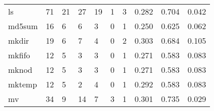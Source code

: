 \begin{longtable}{lp{1.3cm}p{1.3cm}p{1.3cm}p{1.3cm}p{1.3cm}p{1.3cm}p{1.3cm}p{1.3cm}p{1.3cm}}
ls        &                     71 &                                            21 &                                           27 &                                          19 &                                            1 &                                          3 &                                0.282 &                                  0.704 &                                0.042 \\
md5sum    &                     16 &                                             6 &                                            6 &                                           3 &                                            0 &                                          1 &                                0.250 &                                  0.625 &                                0.062 \\
mkdir     &                     19 &                                             6 &                                            7 &                                           4 &                                            0 &                                          2 &                                0.303 &                                  0.684 &                                0.105 \\
mkfifo    &                     12 &                                             5 &                                            3 &                                           3 &                                            0 &                                          1 &                                0.271 &                                  0.583 &                                0.083 \\
mknod     &                     12 &                                             5 &                                            3 &                                           3 &                                            0 &                                          1 &                                0.271 &                                  0.583 &                                0.083 \\
mktemp    &                     12 &                                             5 &                                            2 &                                           4 &                                            0 &                                          1 &                                0.292 &                                  0.583 &                                0.083 \\
mv        &                     34 &                                             9 &                                           14 &                                           7 &                                            3 &                                          1 &                                0.301 &                                  0.735 &                                0.029 \\

\end{longtable}
